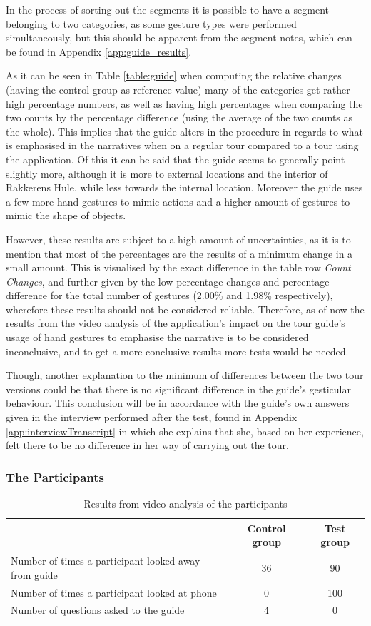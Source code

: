 In the process of sorting out the segments it is possible to have a segment belonging to two categories, as some gesture types were performed simultaneously, but this should be apparent from the segment notes, which can be found in Appendix \ref{app:guide_results}.

As it can be seen in Table \ref{table:guide} when computing the relative changes (having the control group as reference value) many of the categories get rather high percentage numbers, as well as having high percentages when comparing the two counts by the percentage difference (using the average of the two counts as the whole). This implies that the guide alters in the procedure in regards to what is emphasised in the narratives when on a regular tour compared to a tour using the application. Of this it can be said that the guide seems to generally point slightly more, although it is more to external locations and the interior of Rakkerens Hule, while less towards the internal location. Moreover the guide uses a few more hand gestures to mimic actions and a higher amount of gestures to mimic the shape of objects.

However, these results are subject to a high amount of uncertainties, as it is to mention that most of the percentages are the results of a minimum change in a small amount. This is visualised by the exact difference in the table row \textit{Count Changes}, and further given by the low percentage changes and percentage difference for the total number of gestures (2.00\% and 1.98\% respectively), wherefore these results should not be considered reliable. Therefore, as of now the results from the video analysis of the application’s impact on the tour guide’s usage of hand gestures to emphasise the narrative is to be considered inconclusive, and to get a more conclusive results more tests would be needed.

Though, another explanation to the minimum of differences between the two tour versions could be that there is no significant difference in the guide’s gesticular behaviour. This conclusion will be in accordance with the guide’s own answers given in the interview performed after the test, found in Appendix \ref{app:interviewTranscript} in which she explains that she, based on her experience, felt there to be no difference in her way of carrying out the tour.  

\subsubsection{The Participants}
\begin{table}
\begin{tabular}{| p{8cm} | c | c |}\hline
 & Control group & Test group \\ \hline
Number of times a participant looked away from guide & 36 & 90 \\ \hline
Number of times a participant looked at phone & 0 & 100 \\ \hline
Number of questions asked to the guide & 4 & 0 \\  \hline
\end{tabular}
\caption{Results from video analysis of the participants \label{table:participants}}
\end{table}


